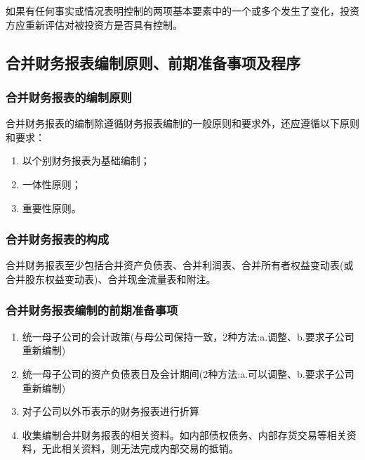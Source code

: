 \documentclass[UTF8,12pt]{ctexart}
\numberwithin{equation}{section} %
\numberwithin{figure}{section}
\numberwithin{table}{section}
\begin{document}
	如果有任何事实或情况表明控制的两项基本要素中的一个或多个发生了变化，投资方应重新评估对被投资方是否具有控制。
	
	\subsection{合并财务报表编制原则、前期准备事项及程序}
	\subsubsection{合并财务报表的编制原则}
	合并财务报表的编制除遵循财务报表编制的一般原则和要求外，还应遵循以下原则和要求：
	\begin{enumerate}
		\item 以个别财务报表为基础编制；
		
		\item 一体性原则；
		
		\item 重要性原则。
	\end{enumerate}
	
	\subsubsection{合并财务报表的构成}
	合并财务报表至少包括合并资产负债表、合并利润表、合并所有者权益变动表(或合并股东权益变动表)、合并现金流量表和附注。
	
	\subsubsection{合并财务报表编制的前期准备事项}
	\begin{enumerate}
		\item 统一母子公司的会计政策(与母公司保持一致，2种方法:a.调整、b.要求子公司重新编制)
		
		\item 统一母子公司的资产负债表日及会计期间(2种方法:a.可以调整、b.要求子公司重新编制)
		
		\item 对子公司以外币表示的财务报表进行折算
		
		\item 收集编制合并财务报表的相关资料。如内部债权债务、内部存货交易等相关资料，无此相关资料，则无法完成内部交易的抵销。
		
	\end{enumerate}
\end{document}
